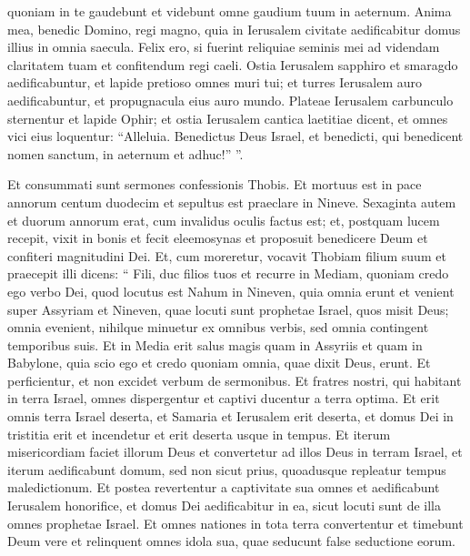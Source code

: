 \begin{biblechapter}
\begin{biblechapter}
\begin{biblechapter}
\begin{biblechapter}
\begin{biblechapter}
\begin{biblechapter}
\begin{biblechapter}
\begin{biblechapter}
\begin{biblechapter}
\begin{biblechapter}
\begin{biblechapter}
\begin{biblechapter}
\begin{biblechapter}
 quoniam in te gaudebunt
 et videbunt omne gaudium tuum in aeternum.
 \verse Anima mea, benedic Domino, regi magno,
 \verse quia in Ierusalem civitate aedificabitur
 domus illius in omnia saecula.
 Felix ero, si fuerint reliquiae seminis mei
 ad videndam claritatem tuam
 et confitendum regi caeli.
 Ostia Ierusalem sapphiro et smaragdo aedificabuntur,
 et lapide pretioso omnes muri tui;
 et turres Ierusalem auro aedificabuntur,
 et propugnacula eius auro mundo. 
\verse Plateae Ierusalem carbunculo sternentur
 et lapide Ophir;
 \verse et ostia Ierusalem cantica laetitiae dicent,
 et omnes vici eius loquentur: “Alleluia.
 Benedictus Deus Israel,
 et benedicti, qui benedicent nomen sanctum,
 in aeternum et adhuc!” ”.
 
\begin{biblechapter}
\verse Et consummati sunt sermones confessionis Thobis.
 Et mortuus est in pace annorum centum duodecim et sepultus est praeclare in Nineve. 
\verse Sexaginta autem et duorum annorum erat, cum invalidus oculis factus est; et, postquam lucem recepit, vixit in bonis et fecit eleemosynas et proposuit benedicere Deum et confiteri magnitudini Dei. 
\verse Et, cum moreretur, vocavit Thobiam filium suum et praecepit illi dicens: “ Fili, duc filios tuos 
\verse et recurre in Mediam, quoniam credo ego verbo Dei, quod locutus est Nahum in Nineven, quia omnia erunt et venient super Assyriam et Nineven, quae locuti sunt prophetae Israel, quos misit Deus; omnia evenient, nihilque minuetur ex omnibus verbis, sed omnia contingent temporibus suis. Et in Media erit salus magis quam in Assyriis et quam in Babylone, quia scio ego et credo quoniam omnia, quae dixit Deus, erunt. Et perficientur, et non excidet verbum de sermonibus. Et fratres nostri, qui habitant in terra Israel, omnes dispergentur et captivi ducentur a terra optima. Et erit omnis terra Israel deserta, et Samaria et Ierusalem erit deserta, et domus Dei in tristitia erit et incendetur et erit deserta usque in tempus. 
\verse Et iterum misericordiam faciet illorum Deus et convertetur ad illos Deus in terram Israel, et iterum aedificabunt domum, sed non sicut prius, quoadusque repleatur tempus maledictionum. Et postea revertentur a captivitate sua omnes et aedificabunt Ierusalem honorifice, et domus Dei aedificabitur in ea, sicut locuti sunt de illa omnes prophetae Israel. 
\verse Et omnes nationes in tota terra convertentur et timebunt Deum vere et relinquent omnes idola sua, quae seducunt false seductione eorum. 

\end{biblechapter}
\end{biblechapter}
\end{biblechapter}
\end{biblechapter}
\end{biblechapter}
\end{biblechapter}
\end{biblechapter}
\end{biblechapter}
\end{biblechapter}
\end{biblechapter}
\end{biblechapter}
\end{biblechapter}
\end{biblechapter}
\end{biblechapter}
